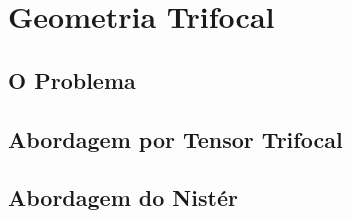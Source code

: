 \section{Geometria Trifocal}

\subsection{O Problema}

\subsection{Abordagem por Tensor Trifocal}

\subsection{Abordagem do Nistér}